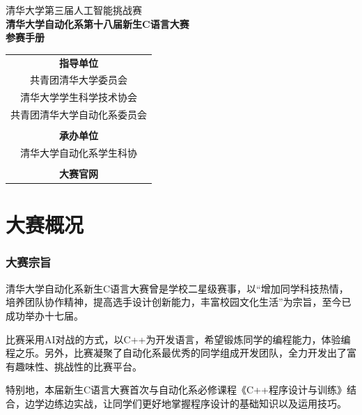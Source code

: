 \documentclass[a4paper,4pt]{article}
\begin{document}
\begin{titlepage}
  \heiti
  \vspace*{20pt}
  \begin{center}
    \fontsize{20pt}{0} {清华大学第三届人工智能挑战赛}\\
    \vspace*{20pt}
    \fontsize{20pt}{0} \textbf{清华大学自动化系第十八届新生C语言大赛}\\
    \vspace*{20pt}
    \fontsize{20pt}{0} \textbf{参赛手册}\\
    \vspace*{280pt}
    \normalsize
    \rmfamily
    \begin{tabular}{c} %
      \textbf{指导单位}            \\
      共青团清华大学委员会         \\
      清华大学学生科学技术协会     \\
      共青团清华大学自动化系委员会 \\
      \\
      \textbf{承办单位}            \\
      清华大学自动化系学生科协     \\
      \\
      \textbf{大赛官网}            \\
    \end{tabular}
  \end{center}
\end{titlepage}


\tableofcontents%
\newpage%
\part{大赛概况}
\section{大赛宗旨}
清华大学自动化系新生C语言大赛曾是学校二星级赛事，以“增加同学科技热情，培养团队协作精神，提高选手设计创新能力，丰富校园文化生活”为宗旨，至今已成功举办十七届。\par
比赛采用AI对战的方式，以C++为开发语言，希望锻炼同学的编程能力，体验编程之乐。另外，比赛凝聚了自动化系最优秀的同学组成开发团队，全力开发出了富有趣味性、挑战性的比赛平台。\par
特别地，本届新生C语言大赛首次与自动化系必修课程《C++程序设计与训练》结合，边学边练边实战，让同学们更好地掌握程序设计的基础知识以及运用技巧。
\end{document}
